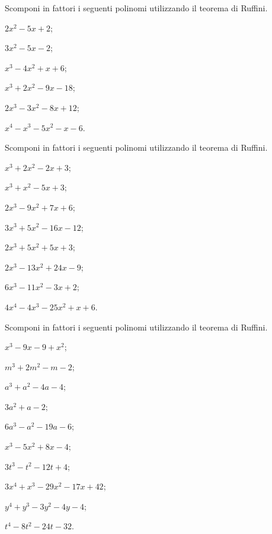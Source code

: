 \begin{esercizio}
\label{ese:13.80}
Scomponi in fattori i seguenti polinomi utilizzando il teorema di
Ruffini.
\begin{multicols}{3}
 \begin{enumeratea}
 \item $2x^{2}-5x+2$;
\item $3x^{2}-5x-2$;
\item $x^{3}-4x^{2}+x+6$;
\item $x^{3}+2x^{2}-9x-18$;
\item $2x^{3}-3x^{2}-8x+12$;
\item $x^{4}-x^{3}-5x^{2}-x-6$.
 \end{enumeratea}
\end{multicols}
\end{esercizio}

\begin{esercizio}
\label{ese:13.81}
Scomponi in fattori i seguenti polinomi utilizzando il teorema di
Ruffini.
\begin{multicols}{2}
 \begin{enumeratea}
 \item $x^{3}+2x^{2}-2x+3$;
\item $x^{3}+x^{2}-5x+3$;
\item $2x^{3}-9x^{2}+7x+6$;
\item $3x^{3}+5x^{2}-16x-12$;
\item $2x^{3}+5x^{2}+5x+3$;
\item $2x^{3}-13x^{2}+24x-9$;
\item $6x^{3}-11x^{2}-3x+2$;
\item $4x^{4}-4x^{3}-25x^{2}+x+6$.
 \end{enumeratea}
\end{multicols}
\end{esercizio}

\begin{esercizio}[\Ast]
\label{ese:13.82}
Scomponi in fattori i seguenti polinomi utilizzando il teorema di
Ruffini.
\begin{multicols}{2}
 \begin{enumeratea}
 \item $x^{3}-9x-9+x^{2}$;
\item $m^{3}+2m^{2}-m-2$;
\item $a^{3}+a^{2}-4a-4$;
\item $3a^{2}+a-2$;
\item $6a^{3}-a^{2}-19a-6$;
\item $x^{3}-5x^{2}+8x-4$;
\item $3t^{3}-t^{2}-12t+4$;
\item $3x^{4}+x^{3}-29x^{2}-17x+42$;
\item $y^{4}+y^{3}-3y^{2}-4y-4$;
\item $t^{4}-8t^{2}-24t-32$.
 \end{enumeratea}
\end{multicols}
\end{esercizio}

